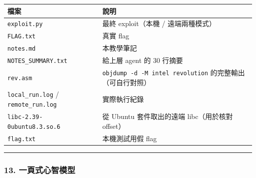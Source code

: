 \documentclass[10pt,a4paper]{article}
\newcounter{none}
\begin{document}
{\def\LTcaptype{none} %
\begin{longtable}[]{@{}
  >{\raggedright\arraybackslash}p{}
  >{\raggedright\arraybackslash}p{}@{}}
\toprule\noalign{}
\begin{minipage}[b]{\linewidth}\raggedright
檔案
\end{minipage} & \begin{minipage}[b]{\linewidth}\raggedright
說明
\end{minipage} \\
\midrule\noalign{}
\endhead
\bottomrule\noalign{}
\endlastfoot
\texttt{exploit.\allowbreak{}py} & 最終 exploit（本機 / 遠端兩種模式） \\
\texttt{FLAG.\allowbreak{}txt} & 真實 flag \\
\texttt{notes.\allowbreak{}md} & 本教學筆記 \\
\texttt{NOTES\_\allowbreak{}SUMMARY.\allowbreak{}txt} & 給上層 agent 的 30 行摘要 \\
\texttt{rev.\allowbreak{}asm} & \texttt{objdump\ \allowbreak{}-\allowbreak{}d\ \allowbreak{}-\allowbreak{}M\ \allowbreak{}intel\ \allowbreak{}revolution}
的完整輸出（可自行對照） \\
\texttt{local\_\allowbreak{}run.\allowbreak{}log} / \texttt{remote\_\allowbreak{}run.\allowbreak{}log} & 實際執行紀錄 \\
\texttt{libc-\allowbreak{}2.\allowbreak{}39-\allowbreak{}0ubuntu8.\allowbreak{}3.\allowbreak{}so.\allowbreak{}6} & 從 Ubuntu 套件取出的遠端
libc（用於核對 offset） \\
\texttt{flag.\allowbreak{}txt} & 本機測試用假 flag \\
\end{longtable}
}

\begin{center}\rule{0.5\linewidth}{0.5pt}\end{center}

\subsubsection{13.
一頁式心智模型}\label{ux4e00ux9801ux5f0fux5fc3ux667aux6a21ux578b}
\end{document}

